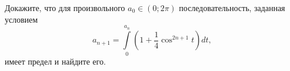 \documentclass{article}
\begin{document}
Докажите, что для произвольного $a_0 \in (0;2\pi)$ последовательность, заданная условием
$$a_{n+1} = \int\limits_0^{a_n} \left( 1 + \frac14 \cos^{2n+1} t \right) dt,$$
имеет предел и найдите его.
\end{document}
